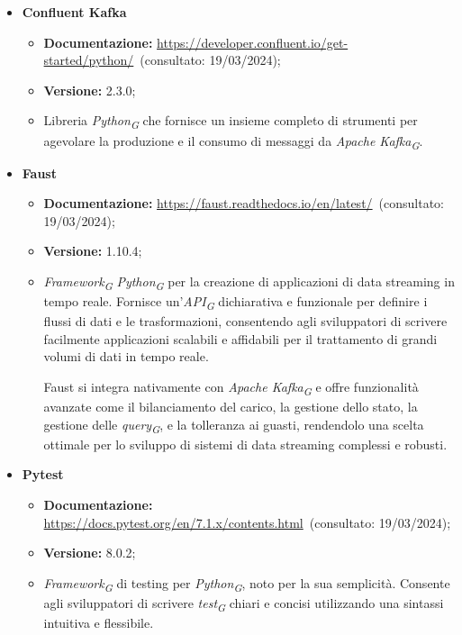 \begin{itemize}
    \item \textbf{Confluent Kafka}
    \begin{itemize}
        \item \textbf{Documentazione:} \url{https://developer.confluent.io/get-started/python/}~(consultato: 19/03/2024);
        \item \textbf{Versione:} 2.3.0;
        \item Libreria \textit{Python}\textsubscript{\textit{G}} che fornisce un insieme completo di strumenti per agevolare la produzione e il consumo di messaggi da \textit{Apache Kafka}\textsubscript{\textit{G}}.
    \end{itemize}
    
    \item \textbf{Faust}
    \begin{itemize}
        \item \textbf{Documentazione:} \url{https://faust.readthedocs.io/en/latest/}~(consultato: 19/03/2024);
        \item \textbf{Versione:} 1.10.4;
        \item \textit{Framework}\textsubscript{\textit{G}} \textit{Python}\textsubscript{\textit{G}} per la creazione di applicazioni di data streaming in tempo reale. Fornisce un'\textit{API}\textsubscript{\textit{G}} dichiarativa e funzionale per definire i flussi di dati e le trasformazioni, consentendo agli sviluppatori di scrivere facilmente applicazioni scalabili e affidabili per il trattamento di grandi volumi di dati in tempo reale.
        
        Faust si integra nativamente con \textit{Apache Kafka}\textsubscript{\textit{G}} e offre funzionalità avanzate come il bilanciamento del carico, la gestione dello stato, la gestione delle \textit{query}\textsubscript{\textit{G}}, e la tolleranza ai guasti, rendendolo una scelta ottimale per lo sviluppo di sistemi di data streaming complessi e robusti.
    \end{itemize}
    
    \item \textbf{Pytest}
    \begin{itemize}
        \item \textbf{Documentazione:} \url{https://docs.pytest.org/en/7.1.x/contents.html}~(consultato: 19/03/2024);
        \item \textbf{Versione:} 8.0.2;
        \item \textit{Framework}\textsubscript{\textit{G}} di testing per \textit{Python}\textsubscript{\textit{G}}, noto per la sua semplicità. Consente agli sviluppatori di scrivere \textit{test}\textsubscript{\textit{G}} chiari e concisi utilizzando una sintassi intuitiva e flessibile.
        

\end{itemize}
\end{itemize}
